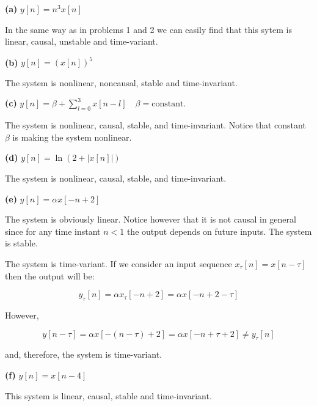 \documentclass[11pt]{article}
\begin{document}
\textbf{(a)} $y[n]=n^3x[n]$

In the same way as in problems 1 and 2 we can easily find that this sytem is linear, causal, unstable and time-variant.

\textbf{(b)} $y[n]=(x[n])^5$

The system is nonlinear, noncausal, stable and time-invariant. 

\textbf{(c)} $y[n]=\beta+\sum_{l=0}^{3} x[n-l] \quad \beta=\textrm{constant}$.

The system is nonlinear, causal, stable, and time-invariant. Notice that constant $\beta$ is making the system nonlinear.

\textbf{(d)} $y[n]=\ln(2+|x[n]|)$ 

The system is nonlinear, causal, stable, and time-invariant.


\textbf{(e)} $y[n]=\alpha x[-n+2]$

The system is obviously linear. Notice however that it is not causal in general since for any time instant $n<1$ the output depends on future inputs. The system is stable. 


The system is time-variant. If we consider an input sequence $x_{\tau}[n]=x[n-\tau]$ then the output will be:

\[
y_{\tau}[n] = \alpha x_{\tau}[-n+2] = \alpha x[-n+2-\tau]
\]

However,

\[
y[n-\tau] = \alpha x[-(n-\tau)+2]=\alpha x[-n+\tau+2]\neq y_{\tau}[n]
\]

and, therefore, the system is time-variant.

\textbf{(f)} $y[n]=x[n-4]$

This system is linear, causal, stable and time-invariant.
\end{document}

